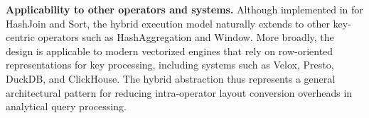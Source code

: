\medskip
\noindent\textbf{Applicability to other operators and systems.}
Although implemented in \proj for HashJoin and Sort, the hybrid execution model naturally extends to other key-centric operators such as HashAggregation and Window.
More broadly, the design is applicable to modern vectorized engines that rely on row-oriented representations for key processing, including systems such as Velox, Presto, DuckDB, and ClickHouse.
The hybrid abstraction thus represents a general architectural pattern for reducing intra-operator layout conversion overheads in analytical query processing.











